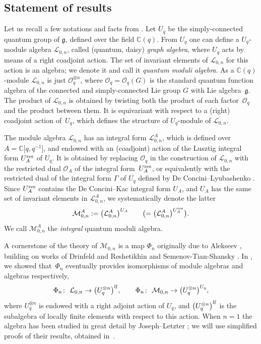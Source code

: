 \documentclass[10pt,a4paper]{amsart}
\numberwithin{equation}{section}
\theoremstyle{definition}
\newcommand{\mc}{\mathbb{C}}
\newcommand{\Ll}{{\mathcal L}}
\newcommand{\Mm}{{\mathcal M}}
\newcommand{\Oo}{{\mathcal O}}
\newcommand{\ra}{\rightarrow}
\begin{document}
\subsection{Statement of results}\label{statement} Let us recall a few notations and facts from \cite{BR}. Let $U_q$ be the simply-connected quantum group of $\mathfrak{g}$, defined over the field $\mc(q)$. From $U_q$ one can define a $U_q$-module algebra $\Ll_{0,n}$, called (quantum, daisy) {\it graph algebra}, where $U_q$ acts by means of a right coadjoint action. The set of invariant elements of $\Ll_{0,n}$ for this action is an algebra; we denote it \smash{$\Mm_{0,n}:=\Ll_{0,n}^{U_q}$} and call it {\it quantum moduli algebra}. As a $\mc(q)$-module $\Ll_{0,n}$ is just $\mathcal{O}_q^{\otimes n}$, where $\mathcal{O}_q = \mathcal{O}_q(G)$ is the standard quantum function algebra of the connected and simply-connected Lie group $G$ with Lie algebra~$\mathfrak{g}$. The product of $\Ll_{0,n}$ is obtained by twisting both the product of each factor~$\Oo_q$ and the product between them. It is equivariant with respect to a (right) coadjoint action of~$U_q$, which defines the structure of $U_q$-module of $\Ll_{0,n}$.

The module algebra $\Ll_{0,n}$ has an {integral form} $\Ll_{0,n}^A$, which is defined over $A=\mc\big[q,q^{-1}\big]$, and endowed with an (coadjoint) action of the Lusztig \cite{Lusztig2} integral form $U_A^{\rm res}$ of $U_q$. It is obtained by replacing $\mathcal{O}_q$ in the construction of $\Ll_{0,n}$ with the restricted dual $\mathcal{O}_A$ of the integral form~$U_A^{\rm res}$, or equivalently with the restricted dual of the integral form $\Gamma$ of $U_q$ defined by De Concini--Lyubashenko \cite{DC-L}. Since $U_A^{\rm res}$ contains the De Concini--Kac \cite{DC-K} integral form $U_A$, and $U_A$ has the same set of invariant elements in $\Ll_{0,n}^A$, we systematically denote the latter
\[\Mm_{0,n}^A := \big(\Ll_{0,n}^A\big)^{U_A} \qquad \bigl(=\big(\Ll_{0,n}^A\big)^{U_A^{\rm res}}\bigr).\]
We call $\Mm_{0,n}^A$ the {\it integral} quantum moduli algebra.

A cornerstone of the theory of $\Mm_{0,n}$ is a map $\Phi_n$ originally due to Alekseev \cite{A}, building on works of Drinfeld \cite{Dr} and Reshetikhin and Semenov-Tian-Shansky \cite{RSTS}. In \cite{BR}, we showed that~$\Phi_n$ eventually provides isomorphisms of module algebras and algebras respectively,
\[\Phi_n\colon\ \Ll_{0,n} \ra \big(U_q^{\otimes n}\big)^{\rm lf},\qquad \Phi_n\colon\ \Mm_{0,n} \ra \big(U_q^{\otimes n}\big)^{U_q},
\]
where $U_q^{\otimes n}$ is endowed with a right adjoint action of $U_q$, and $\big(U_q^{\otimes n}\big)^{\rm lf}$ is the subalgebra of locally finite elements with respect to this action. When $n=1$ the algebra  has been studied in great detail by Joseph--Letzter \cite{Jos,JL,JL2}; we will use simplified proofs of their results, obtained in~\cite{VY}.
\end{document}
